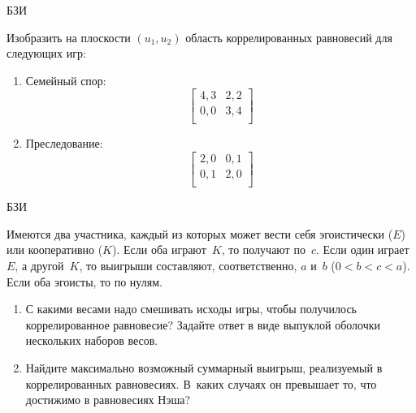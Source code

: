 \begin{problem}
\begin{source}
БЗИ
\end{source}
Изобразить на плоскости $(u_1,u_2)$ область коррелированных
равновесий для следующих игр:

\begin{enumerate}

\item Семейный спор:
\[\left[\begin{array}{ll}
4,3&2,2\\ 0,0&3,4\\
\end{array}\right]\]

\item Преследование:
\[\left[\begin{array}{ll}
2,0&0,1\\ 0,1&2,0\\
\end{array}\right]\]

\end{enumerate}




\begin{sol}

\end{sol}
\end{problem}







\begin{problem}\begin{source}
БЗИ
\end{source}
 Имеются
два участника, каждый из которых может вести себя
эгоистически ($E$) или кооперативно ($K$). Если оба
играют~$K$, то получают по~$c$. Если один играет~$E$, а
другой~$K$, то выигрыши составляют, соответственно, $a$
и~$b$ (${0<b<c<a}$). Если оба эгоисты, то по нулям.

\begin{enumerate}

\item С какими весами надо смешивать исходы игры, чтобы
получилось коррелированное равновесие? Задайте ответ в виде
выпуклой оболочки нескольких наборов весов.

\item Найдите максимально возможный суммарный выигрыш,
реализуемый в коррелированных равновесиях. В~каких случаях
он превышает то, что достижимо в равновесиях Нэша?

\end{enumerate}






\begin{sol}

\end{sol}
\end{problem}




